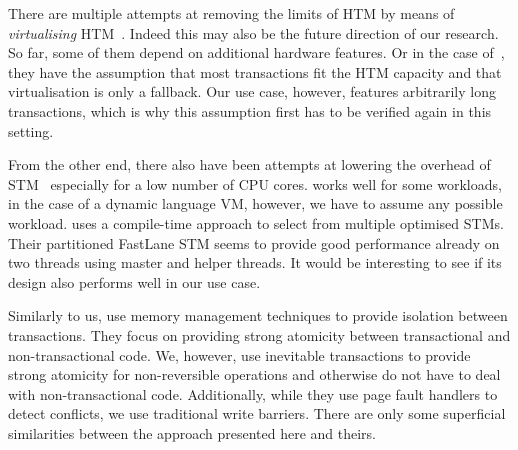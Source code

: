 \documentclass{sigplanconf}
\begin{document}
There are multiple attempts at removing the limits of HTM by means of
\emph{virtualising} HTM~\cite{rajwar05,chung06}. Indeed this may also
be the future direction of our research. So far, some of them depend
on additional hardware features. Or in the case of~\cite{chung06},
they have the assumption that most transactions fit the HTM capacity
and that virtualisation is only a fallback. Our use case, however,
features arbitrarily long transactions, which is why this assumption
first has to be verified again in this setting.

From the other end, there also have been attempts at lowering the
overhead of STM~\cite{warmhoff13,spear09} especially for a low number
of CPU cores. \cite{spear09} works well for some workloads, in the
case of a dynamic language VM, however, we have to assume any possible
workload.  \cite{warmhoff13} uses a compile-time approach to select
from multiple optimised STMs. Their partitioned FastLane STM seems to
provide good performance already on two threads using master and
helper threads. It would be interesting to see if its design also
performs well in our use case.

Similarly to us, \cite{martin09} use memory management techniques to
provide isolation between transactions. They focus on providing strong
atomicity between transactional and non-transactional code.  We,
however, use inevitable transactions to provide strong atomicity
for non-reversible operations and otherwise do not have to deal
with non-transactional code.  Additionally, while they use page fault
handlers to detect conflicts, we use traditional write barriers. There
are only some superficial similarities between the approach presented
here and theirs.



\end{document}
